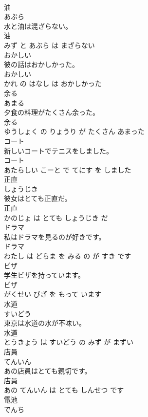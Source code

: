 \documentclass[8pt]{extreport}
\begin{document}
\begin{CJK}{UTF8}{min}
\\	油	
\\	あぶら			
\\	水と油は混ざらない。	
\\	油 
\\	みず と あぶら は まざらない			
\\	おかしい	
\\	彼の話はおかしかった。	
\\	おかしい 
\\	かれ の はなし は おかしかった			
\\	余る	
\\	あまる			
\\	夕食の料理がたくさん余った。	
\\	余る 
\\	ゆうしょく の りょうり が たくさん あまった			
\\	コート	
\\	新しいコートでテニスをしました。	
\\	コート 
\\	あたらしい こーと で てにす を しました			
\\	正直	
\\	しょうじき			
\\	彼女はとても正直だ。	
\\	正直 
\\	かのじょ は とても しょうじき だ			
\\	ドラマ	
\\	私はドラマを見るのが好きです。	
\\	ドラマ 
\\	わたし は どらま を みる の が すき です			
\\	ビザ	
\\	学生ビザを持っています。	
\\	ビザ 
\\	がくせい びざ を もって います			
\\	水道	
\\	すいどう			
\\	東京は水道の水が不味い。	
\\	水道 
\\	とうきょう は すいどう の みず が まずい			
\\	店員	
\\	てんいん			
\\	あの店員はとても親切です。	
\\	店員 
\\	あの てんいん は とても しんせつ です			
\\	電池	
\\	でんち			

\end{CJK}
\end{document}
